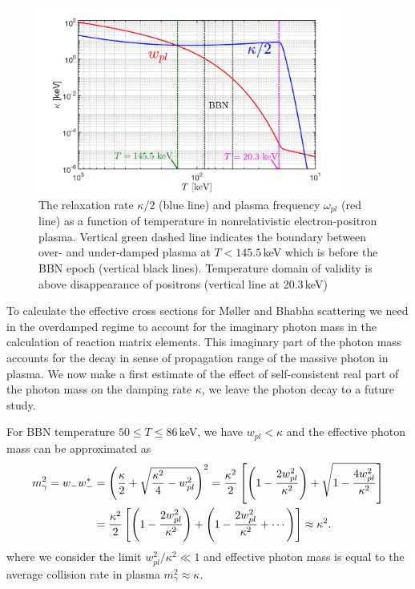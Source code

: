 \begin{figure}  
\centerline{\includegraphics[width=0.9\textwidth]{./plots/KappaElectronPhotonMass_Talk}}
\caption{The relaxation rate $\kappa/2$ (blue line) and plasma frequency $\omega_{pl}$ (red line) as a function of temperature in nonrelativistic electron-positron plasma. Vertical green dashed line indicates the boundary between over- and under-damped plasma at  $T<145.5$\,keV  which is before the BBN epoch (vertical black lines). Temperature domain of validity is above disappearance of positrons (vertical line at 20.3\,keV)}
\label{RelaxationRate002:fig} 
\end{figure}

To calculate the effective cross sections for  M{\o}ller and Bhabha scattering we need in the overdamped regime to account for the imaginary photon mass in the calculation of reaction matrix elements. This imaginary part of the photon mass accounts for the decay in sense  of propagation range of the massive photon in plasma. We now make a first estimate of the effect of self-consistent real part of the photon mass on the damping rate $\kappa$, we leave the photon decay to a future study.

For BBN temperature $50\leqslant T\leqslant 86$\,keV,
we have $w_{pl}<\kappa$ and the effective photon mass can be approximated as
\begin{align}
m^2_\gamma=w_-w_-^\ast&=\left(\frac{\kappa}{2}+\sqrt{\frac{\kappa^2}{4}-w^2_{pl}}\right)^2
=\frac{\kappa^2}{2}\left[\left(1-\frac{2w^2_{pl}}{\kappa^2}\right)+\sqrt{1-\frac{4w^2_{pl}}{\kappa^2}}\right]\notag\\
&=\frac{\kappa^2}{2}\left[\left(1-\frac{2w^2_{pl}}{\kappa^2}\right)+\left(1-\frac{2w^2_{pl}}{\kappa^2}+\cdots\right)\right]\approx\kappa^2.
\label{PhotonMassPlasma002}
\end{align}
where we consider the limit $w^2_{pl}/\kappa^2\ll 1$ and effective photon mass is equal to the average collision rate in plasma $m^2_\gamma\approx\kappa$.

